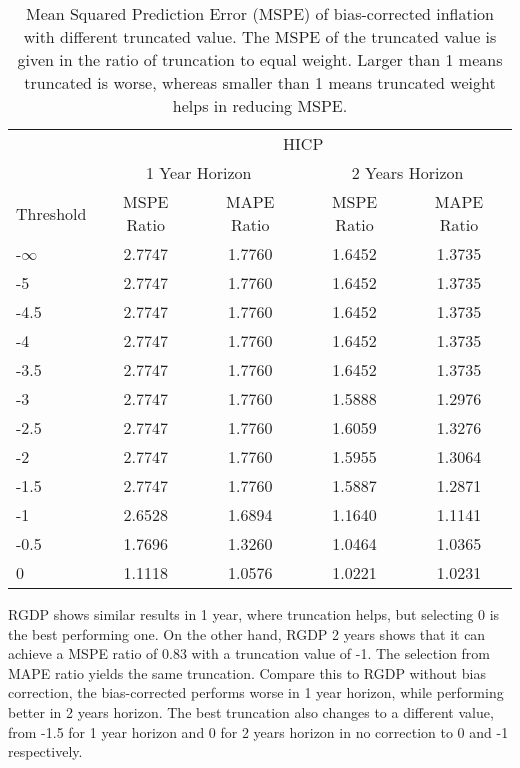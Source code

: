 \documentclass[11pt]{article}
\begin{document}
\begin{table}[!h]
\centering
\caption{Mean Squared Prediction Error (MSPE) of bias-corrected inflation with different truncated value. The MSPE of the truncated value is given in the ratio of truncation to equal weight. Larger than 1 means truncated is worse, whereas smaller than 1 means truncated weight helps in reducing MSPE.}
\label{tab: MSPE HICP bias}
\begin{tabular}{lcccc}
	\hline
	                                                &                        \multicolumn{4}{c}{HICP}                         \\
	\cmidrule(lr){2-5}                              & \multicolumn{2}{c}{1 Year Horizon} & \multicolumn{2}{c}{2 Years Horizon} \\
	\cmidrule(lr){2-3} \cmidrule(lr){4-5}
Threshold & MSPE Ratio & MAPE Ratio  & MSPE Ratio & MAPE Ratio  \\ \hline
-$\infty$ & 2.7747 & 1.7760 & 1.6452 & 1.3735\\ 
-5 & 2.7747 & 1.7760 & 1.6452 & 1.3735\\ 
-4.5 & 2.7747 & 1.7760 & 1.6452 & 1.3735\\ 
-4 & 2.7747 & 1.7760 & 1.6452 & 1.3735\\ 
-3.5 & 2.7747 & 1.7760 & 1.6452 & 1.3735\\ 
-3 & 2.7747 & 1.7760 & 1.5888 & 1.2976\\ 
-2.5 & 2.7747 & 1.7760 & 1.6059 & 1.3276\\ 
-2 & 2.7747 & 1.7760 & 1.5955 & 1.3064\\ 
-1.5 & 2.7747 & 1.7760 & 1.5887 & 1.2871\\ 
-1 & 2.6528 & 1.6894 & 1.1640 & 1.1141\\ 
-0.5 & 1.7696 & 1.3260 & 1.0464 & 1.0365\\ 
0 & 1.1118 & 1.0576 & 1.0221 & 1.0231\\ \hline
\end{tabular}
\end{table}


RGDP shows similar results in 1 year, where truncation helps, but selecting 0 is the best performing one. On the other hand, RGDP 2 years shows that it can achieve a MSPE ratio of 0.83 with a truncation value of -1. The selection from MAPE ratio yields the same truncation. Compare this to RGDP without bias correction, the bias-corrected performs worse in 1 year horizon, while performing better in 2 years horizon. The best truncation also changes to a different value, from -1.5 for 1 year horizon and 0 for 2 years horizon in no correction to 0 and -1 respectively.
\end{document}
